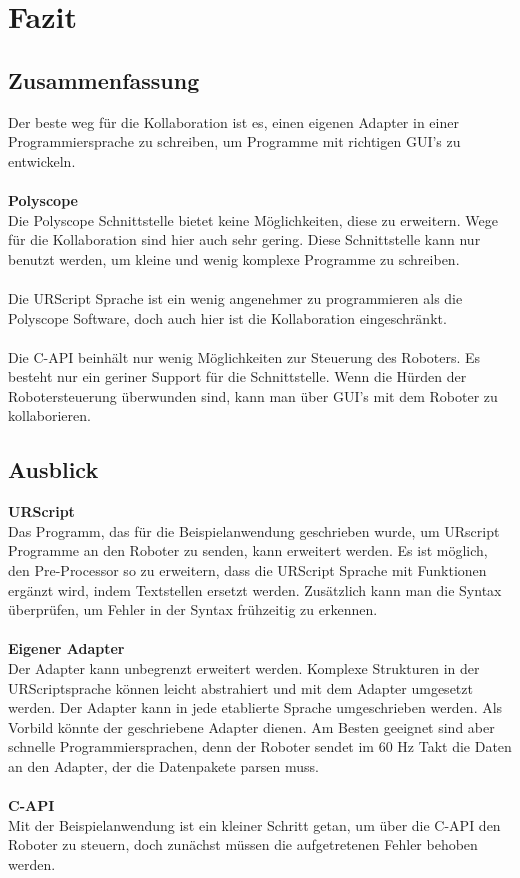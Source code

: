 \chapter{Fazit}

\section{Zusammenfassung}
\label{sec:Zusammenfassung}

Der beste weg für die Kollaboration ist es, einen eigenen Adapter in einer Programmiersprache zu schreiben, um Programme mit richtigen \ac{GUI}'s zu entwickeln.
\\\\
\textbf{Polyscope}\\
Die Polyscope Schnittstelle bietet keine Möglichkeiten, diese zu erweitern. Wege für die Kollaboration sind hier auch sehr gering. Diese Schnittstelle kann nur benutzt werden, um kleine und wenig komplexe Programme zu schreiben.
\\\\
Die URScript Sprache ist ein wenig angenehmer zu programmieren als die Polyscope Software, doch auch hier ist die Kollaboration eingeschränkt.
\\\\
Die C-API beinhält nur wenig Möglichkeiten zur Steuerung des Roboters. Es besteht nur ein geriner Support für die Schnittstelle. Wenn die Hürden der Robotersteuerung überwunden sind, kann man über \ac{GUI}'s mit dem Roboter zu kollaborieren.

\section{Ausblick}
\label{sec:ausblick}

\textbf{URScript}\\
Das Programm, das für die Beispielanwendung geschrieben wurde, um URscript Programme an den Roboter zu senden, kann erweitert werden. Es ist möglich, den Pre-Processor so zu erweitern, dass die URScript Sprache mit Funktionen ergänzt wird, indem Textstellen ersetzt werden. Zusätzlich kann man die Syntax überprüfen, um Fehler in der Syntax frühzeitig zu erkennen.
\\\\
\textbf{Eigener Adapter}\\
Der Adapter kann unbegrenzt erweitert werden. Komplexe Strukturen in der URScriptsprache können leicht abstrahiert und mit dem Adapter umgesetzt werden. Der Adapter kann in jede etablierte Sprache umgeschrieben werden. Als Vorbild könnte der geschriebene Adapter dienen. Am Besten geeignet sind aber schnelle Programmiersprachen, denn der Roboter sendet im 60 Hz Takt die Daten an den Adapter, der die Datenpakete parsen muss.
\\\\
\textbf{C-API}\\
Mit der Beispielanwendung ist ein kleiner Schritt getan, um über die C-API den Roboter zu steuern, doch zunächst müssen die aufgetretenen Fehler behoben werden.